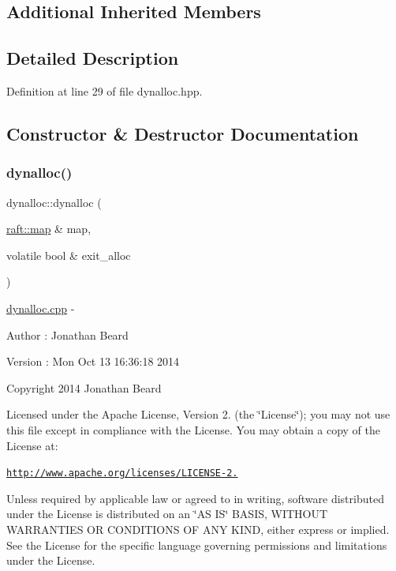 \subsection*{Additional Inherited Members}


\subsection{Detailed Description}


Definition at line 29 of file dynalloc.\+hpp.



\subsection{Constructor \& Destructor Documentation}
\hypertarget{classdynalloc_ad5aa0343bab70d1f51e05953d890e8d2}{}\label{classdynalloc_ad5aa0343bab70d1f51e05953d890e8d2} 
\subsubsection{\texorpdfstring{dynalloc()}{dynalloc()}}
{\footnotesize\ttfamily dynalloc\+::dynalloc (\begin{DoxyParamCaption}\item[{\hyperlink{classraft_1_1map}{raft\+::map} \&}]{map,  }\item[{volatile bool \&}]{exit\+\_\+alloc }\end{DoxyParamCaption})}

\hyperlink{dynalloc_8cpp_source}{dynalloc.\+cpp} -\/ \begin{DoxyAuthor}{Author}
\+: Jonathan Beard 
\end{DoxyAuthor}
\begin{DoxyVersion}{Version}
\+: Mon Oct 13 16\+:36\+:18 2014
\end{DoxyVersion}
Copyright 2014 Jonathan Beard

Licensed under the Apache License, Version 2. (the \char`\"{}\+License\char`\"{}); you may not use this file except in compliance with the License. You may obtain a copy of the License at\+:

\href{http://www.apache.org/licenses/LICENSE-2.0}{\tt http\+://www.\+apache.\+org/licenses/\+L\+I\+C\+E\+N\+S\+E-\/2.}

Unless required by applicable law or agreed to in writing, software distributed under the License is distributed on an \char`\"{}\+A\+S I\+S\char`\"{} B\+A\+S\+IS, W\+I\+T\+H\+O\+UT W\+A\+R\+R\+A\+N\+T\+I\+ES OR C\+O\+N\+D\+I\+T\+I\+O\+NS OF A\+NY K\+I\+ND, either express or implied. See the License for the specific language governing permissions and limitations under the License. 

